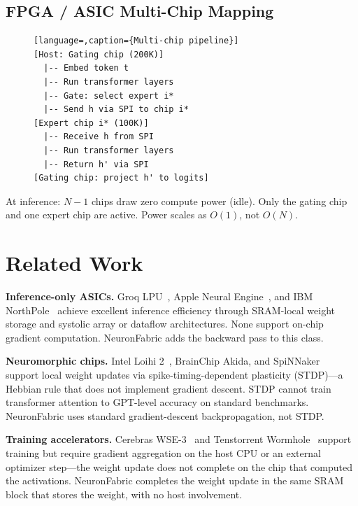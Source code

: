 \documentclass[11pt]{article}
\begin{document}
\subsection{FPGA / ASIC Multi-Chip Mapping}

\begin{figure}[ht]
\begin{lstlisting}[language=,caption={Multi-chip pipeline}]
[Host: Gating chip (200K)]
  |-- Embed token t
  |-- Run transformer layers
  |-- Gate: select expert i*
  |-- Send h via SPI to chip i*
[Expert chip i* (100K)]
  |-- Receive h from SPI
  |-- Run transformer layers
  |-- Return h' via SPI
[Gating chip: project h' to logits]
\end{lstlisting}
\end{figure}

At inference: $N-1$ chips draw zero compute power (idle). Only the gating chip
and one expert chip are active. Power scales as $O(1)$, not $O(N)$.

\section{Related Work}

\label{sec:related}

\textbf{Inference-only ASICs.} Groq LPU~\cite{groq}, Apple Neural Engine~\cite{apple_ane},
and IBM NorthPole~\cite{ibm_northpole} achieve excellent inference efficiency through
SRAM-local weight storage and systolic array or dataflow architectures. None support
on-chip gradient computation. NeuronFabric adds the backward pass to this class.

\textbf{Neuromorphic chips.} Intel Loihi 2~\cite{loihi2}, BrainChip Akida, and
SpiNNaker~\cite{spinnaker} support local weight updates via spike-timing-dependent
plasticity (STDP)---a Hebbian rule that does not implement gradient descent.
STDP cannot train transformer attention to GPT-level accuracy on standard benchmarks.
NeuronFabric uses standard gradient-descent backpropagation, not STDP.

\textbf{Training accelerators.} Cerebras WSE-3~\cite{cerebras} and Tenstorrent
Wormhole~\cite{tenstorrent} support training but require gradient aggregation on
the host CPU or an external optimizer step---the weight update does not complete
on the chip that computed the activations. NeuronFabric completes the weight update
in the same SRAM block that stores the weight, with no host involvement.
\end{document}
